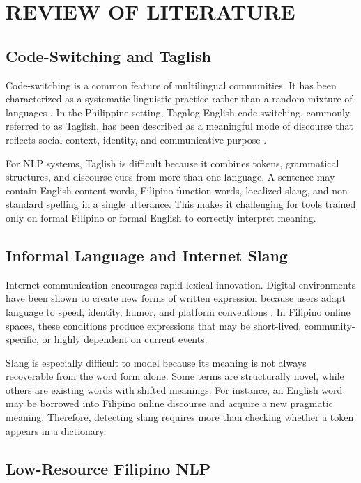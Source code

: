 \section{REVIEW OF LITERATURE}

\subsection{Code-Switching and Taglish}

Code-switching is a common feature of multilingual communities.
It has been characterized as a systematic linguistic practice
rather than a random mixture of languages \cite{b2}. In the
Philippine setting, Tagalog-English code-switching, commonly
referred to as Taglish, has been described as a meaningful mode
of discourse that reflects social context, identity, and
communicative purpose \cite{b1,b3}.

For NLP systems, Taglish is difficult because it combines
tokens, grammatical structures, and discourse cues from more
than one language. A sentence may contain English content
words, Filipino function words, localized slang, and
non-standard spelling in a single utterance. This makes it
challenging for tools trained only on formal Filipino or formal
English to correctly interpret meaning.

\subsection{Informal Language and Internet Slang}

Internet communication encourages rapid lexical innovation.
Digital environments have been shown to create new forms of
written expression because users adapt language to speed,
identity, humor, and platform conventions \cite{b4}. In
Filipino online spaces, these conditions produce expressions
that may be short-lived, community-specific, or highly
dependent on current events.

Slang is especially difficult to model because its meaning is
not always recoverable from the word form alone. Some terms are
structurally novel, while others are existing words with
shifted meanings. For instance, an English word may be borrowed
into Filipino online discourse and acquire a new pragmatic
meaning. Therefore, detecting slang requires more than checking
whether a token appears in a dictionary.

\subsection{Low-Resource Filipino NLP}

